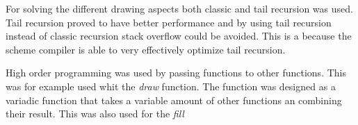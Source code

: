 For solving the different drawing aspects both classic and tail recursion was used. Tail recursion proved to have better performance and by using tail recursion instead of classic recursion stack overflow could be avoided. This is a because the scheme compiler is able to very effectively optimize tail recursion.

High order programming was used by passing functions to other functions. This was for example used whit the \emph{draw} function. The function was designed as a variadic function that takes a variable amount of other functions an combining their result. This was also used for the \emph{fill} 

